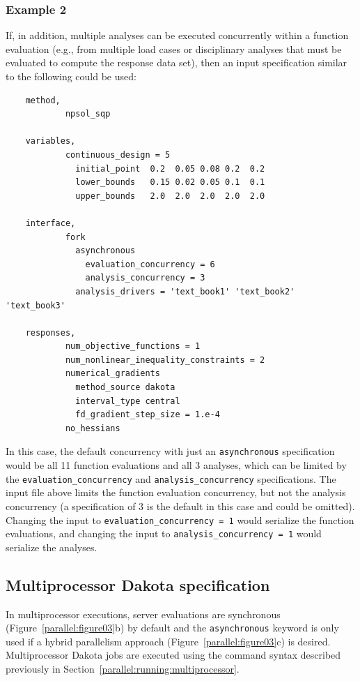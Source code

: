 \subsubsection{Example 2}\label{parallel:spec:single:example2}

If, in addition, multiple analyses can be executed concurrently within
a function evaluation (e.g., from multiple load cases or disciplinary
analyses that must be evaluated to compute the response data set),
then an input specification similar to the following could be used:
\begin{small}
\begin{verbatim}
    method,
            npsol_sqp

    variables,
            continuous_design = 5
              initial_point  0.2  0.05 0.08 0.2  0.2
              lower_bounds   0.15 0.02 0.05 0.1  0.1
              upper_bounds   2.0  2.0  2.0  2.0  2.0

    interface,
            fork
              asynchronous
                evaluation_concurrency = 6
                analysis_concurrency = 3
              analysis_drivers = 'text_book1' 'text_book2' 'text_book3'

    responses,
            num_objective_functions = 1
            num_nonlinear_inequality_constraints = 2
            numerical_gradients
              method_source dakota
              interval_type central
              fd_gradient_step_size = 1.e-4
            no_hessians
\end{verbatim}
\end{small}

In this case, the default concurrency with just an
\texttt{asynchronous} specification would be all 11 function
evaluations and all 3 analyses, which can be limited by the
\texttt{evaluation\_concurrency} and \texttt{analysis\_concurrency}
specifications. The input file above limits the function evaluation
concurrency, but not the analysis concurrency (a specification of 3 is
the default in this case and could be omitted). Changing the input to
\texttt{evaluation\_concurrency = 1} would serialize the function
evaluations, and changing the input to \texttt{analysis\_concurrency = 1}
would serialize the analyses.

\subsection{Multiprocessor Dakota specification}\label{parallel:spec:multi}

In multiprocessor executions, server evaluations are synchronous
(Figure~\ref{parallel:figure03}b) by default and the
\texttt{asynchronous} keyword is only used if a hybrid parallelism
approach (Figure~\ref{parallel:figure03}c) is desired. Multiprocessor
Dakota jobs are executed using the command syntax described previously
in Section~\ref{parallel:running:multiprocessor}.

